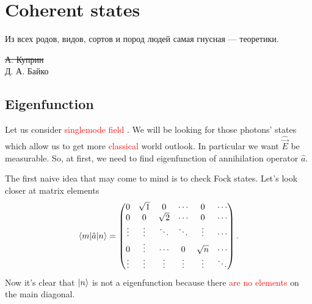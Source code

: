 \section{Coherent states}

\epigraph{Из всех родов, видов, сортов и пород людей самая гнусная --- теоретики.}{\sout{А. Куприн} \\Д. А. Байко}

\subsection{Eigenfunction}

Let us consider {\textcolor{red}{ singlemode field }}.
 We will be looking for those photons' states which allow us to get more {\textcolor{red} {classical}} world outlook. In particular we want $\hat{\vec{E}}$ be measurable. So, at first, we need to find eigenfunction of annihilation operator $\hat{a}$.

The first naive idea that may come to mind is to check Fock states. Let's look closer at matrix elements
\begin{equation}
	\langle m\rvert \hat{a} \lvert n\rangle =
	\begin{pmatrix}
		0 & \sqrt{1} & 0 &  \cdots  & 0 & \cdots \\
		0 & 0 & \sqrt{2} &  \cdots & 0 & \cdots \\
		\vdots & \vdots & \ddots & \ddots & \vdots  & \cdots \\
		0 & \vdots & \cdots & 0 & \sqrt{n} & \cdots \\
		\vdots & \vdots & \vdots & \vdots & \vdots & \ddots\\
	\end{pmatrix}.
\end{equation}
Now it's clear that {\textcolor{red}{ $\lvert n\rangle$ }}is not a eigenfunction because there {\textcolor{red} {are no elements }}on the main diagonal.

